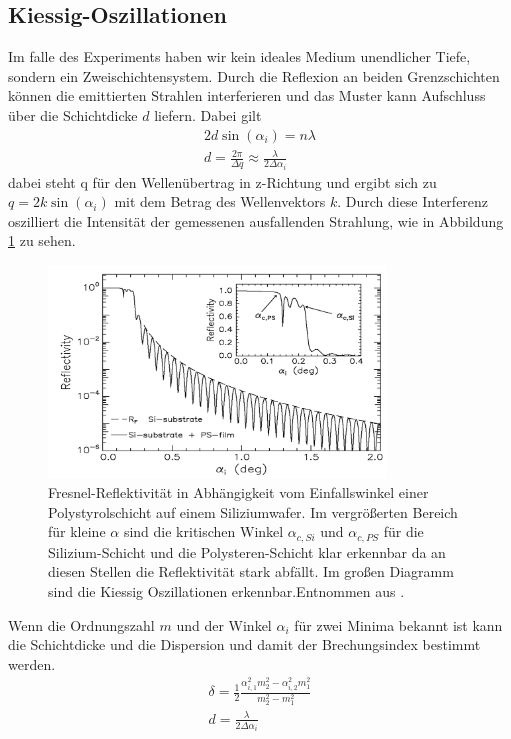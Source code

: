     \subsection{Kiessig-Oszillationen}
        Im falle des Experiments haben wir kein ideales Medium unendlicher Tiefe, sondern ein Zweischichtensystem.
        Durch die Reflexion an beiden Grenzschichten können die emittierten Strahlen interferieren und das Muster kann Aufschluss über die Schichtdicke $d$ liefern.
        Dabei gilt
        \begin{align}
            2 d \sin\left(\alpha_i\right) = n\lambda\\
            d = \frac{2\pi}{\Delta q} ≈ \frac{\lambda}{2\Delta\alpha_i}
        \end{align}
        dabei steht q für den Wellenübertrag in z-Richtung und ergibt sich zu $q = 2k \sin\left(\alpha_i\right)$ mit dem Betrag des Wellenvektors $k$.
        Durch diese Interferenz oszilliert die Intensität der gemessenen ausfallenden Strahlung, wie in Abbildung \ref{fig:oszillation} zu sehen.
        \begin{figure}[ht]
            \centering
            \includegraphics[width = 0.8\textwidth]{bilder/Oszillation.png}
            \caption{Fresnel-Reflektivität in Abhängigkeit vom Einfallswinkel einer Polystyrolschicht auf einem Siliziumwafer. Im vergrößerten Bereich für kleine $\alpha$ sind die kritischen Winkel $\alpha_{c,Si}$ und $\alpha_{c,PS}$ für die Silizium-Schicht und die Polysteren-Schicht klar erkennbar da an diesen Stellen die Reflektivität stark abfällt. Im großen Diagramm sind die Kiessig Oszillationen erkennbar.Entnommen aus \cite{tolan}.}
            \label{fig:oszillation}
        \end{figure}
        Wenn die Ordnungszahl $m$ und der Winkel $\alpha_i$ für zwei Minima bekannt ist kann die Schichtdicke und die Dispersion und damit der Brechungsindex bestimmt werden.
        \begin{align}
            \delta = \frac{1}{2} \frac{\alpha_{i,1}^2 m_2^2 - \alpha_{i,2}^2 m_1^2}{m_2^2 -m_1^2}\\
            d = \frac{\lambda}{2\Delta\alpha_i}
        \end{align}
